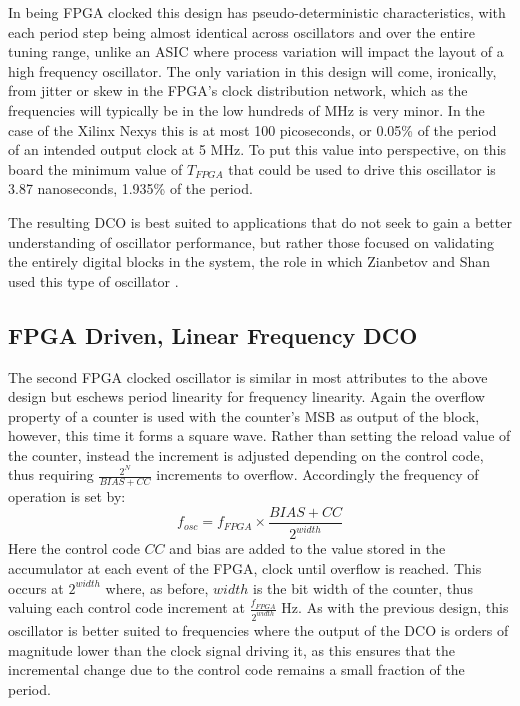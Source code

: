 In being \ac{FPGA} clocked this design has pseudo-deterministic characteristics, with each period step being almost identical across oscillators and over the entire tuning range, unlike an \ac{ASIC} where process variation will impact the layout of a high frequency oscillator. The only variation in this design will come, ironically, from jitter or skew in the \ac{FPGA}'s clock distribution network, which as the frequencies will typically be in the low hundreds of MHz is very minor. In the case of the Xilinx \acl{Nexys} this is at most 100 picoseconds, or 0.05\% of the period of an intended output clock at 5 MHz. To put this value into perspective, on this board the minimum value of $T_{FPGA}$ that could be used to drive this oscillator is 3.87 nanoseconds, 1.935\% of the period.

The resulting \ac{DCO} is best suited to applications that do not seek to gain a better understanding of oscillator performance, but rather those focused on validating the entirely digital blocks in the system, the role in which Zianbetov and Shan used this type of oscillator \cite{zianbetov2013phd,shan2014phd}.

\subsection{\acs{FPGA} Driven, Linear Frequency \acs{DCO}}
The second \ac{FPGA} clocked oscillator is similar in most attributes to the above design but eschews period linearity for frequency linearity. Again the overflow property of a counter is used with the counter's \ac{MSB} as output of the block, however, this time it forms a square wave. Rather than setting the reload value of the counter, instead the increment is adjusted depending on the control code, thus requiring $\frac{2^N}{BIAS+CC}$ increments to overflow. Accordingly the frequency of operation is set by:
\begin{equation}
	f_{osc} = f_{FPGA}\times\frac{BIAS+CC}{2^{width}}
\end{equation}
Here the control code $CC$ and bias are added to the value stored in the accumulator at each event of the \ac{FPGA}, clock until overflow is reached. This occurs at $2^{width}$ where, as before, $width$ is the bit width of the counter, thus valuing each control code increment at $\frac{f_{FPGA}}{2^{width}}$ Hz. As with the previous design, this oscillator is better suited to frequencies where the output of the \ac{DCO} is orders of magnitude lower than the clock signal driving it, as this ensures that the incremental change due to the control code remains a small fraction of the period.

